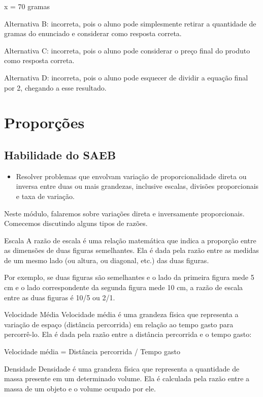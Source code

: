 x = 70 gramas

Alternativa B: incorreta, pois o aluno pode simplesmente retirar a
quantidade de gramas do enunciado e considerar como resposta correta.

Alternativa C: incorreta, pois o aluno pode considerar o preço final do
produto como resposta correta.

Alternativa D: incorreta, pois o aluno pode esquecer de dividir a
equação final por 2, chegando a esse resultado.

\chapter{Proporções}

\section{Habilidade do SAEB} 

\begin{itemize}
    \item Resolver problemas que envolvam variação de
proporcionalidade direta ou inversa entre duas ou mais grandezas,
inclusive escalas, divisões proporcionais e taxa de variação.

\end{itemize}

Neste módulo, falaremos sobre variações direta e inversamente
proporcionais. Comecemos discutindo alguns tipos de razões.

Escala A razão de escala é uma relação matemática que indica a proporção
entre as dimensões de duas figuras semelhantes. Ela é dada pela razão
entre as medidas de um mesmo lado (ou altura, ou diagonal, etc.) das
duas figuras.

Por exemplo, se duas figuras são semelhantes e o lado da primeira figura
mede 5 cm e o lado correspondente da segunda figura mede 10 cm, a razão
de escala entre as duas figuras é 10/5 ou 2/1.

Velocidade Média Velocidade média é uma grandeza física que representa a
variação de espaço (distância percorrida) em relação ao tempo gasto para
percorrê-lo. Ela é dada pela razão entre a distância percorrida e o
tempo gasto:

Velocidade média = Distância percorrida / Tempo gasto

Densidade Densidade é uma grandeza física que representa a quantidade de
massa presente em um determinado volume. Ela é calculada pela razão
entre a massa de um objeto e o volume ocupado por ele.

